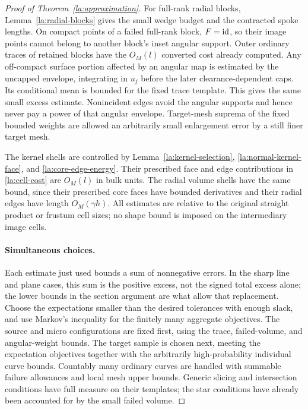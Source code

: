 \begin{proof}[Proof of Theorem~\ref{la:approximation}]
For full-rank radial blocks, Lemma~\ref{la:radial-blocks} gives the
small wedge budget and the contracted spoke lengths.  On compact
points of a failed full-rank block, $F=\operatorname{id}$, so their image points
cannot belong to another block's inset angular support.  Outer
ordinary traces of retained blocks have the $O_M(l)$ converted cost
already computed.  Any off-compact surface portion affected by an
angular map is estimated by the uncapped envelope, integrating in
$u_j$ before the later clearance-dependent caps.  Its conditional
mean is bounded for the fixed trace template.  This gives the same
small excess estimate.  Nonincident edges avoid the angular
supports and hence never pay a power of that angular envelope.
Target-mesh suprema of the fixed bounded weights are allowed an
arbitrarily small enlargement error by a still finer target mesh.

The kernel shells are controlled by
Lemma~\ref{la:kernel-selection},
\eqref{la:normal-kernel-face}, and
\eqref{la:core-edge-energy}.  Their prescribed face and edge
contributions in \eqref{la:cell-cost} are $O_M(l)$ in bulk units.
The radial volume shells have the same bound, since their prescribed
core faces have bounded derivatives and their radial edges have
length $O_M(\gamma h)$.  All estimates are relative to the original
straight product or frustum cell sizes; no shape bound is imposed
on the intermediary image cells.

\paragraph{Simultaneous choices.}
Each estimate just used bounds a sum of nonnegative errors.  In the
sharp line and plane cases, this sum is the positive excess, not the
signed total excess alone; the lower bounds in the section argument
are what allow that replacement.  Choose the expectations smaller
than the desired tolerances with enough slack, and use Markov's
inequality for the finitely many aggregate objectives.  The source
and micro configurations are fixed first, using the trace,
failed-volume, and angular-weight bounds.  The target sample is
chosen next, meeting the expectation objectives together with the
arbitrarily high-probability individual curve bounds.  Countably
many ordinary curves are handled with summable failure allowances
and local mesh upper bounds.  Generic slicing and intersection
conditions have full measure on their templates; the star conditions
have already been accounted for by the small failed volume.


\end{proof}
